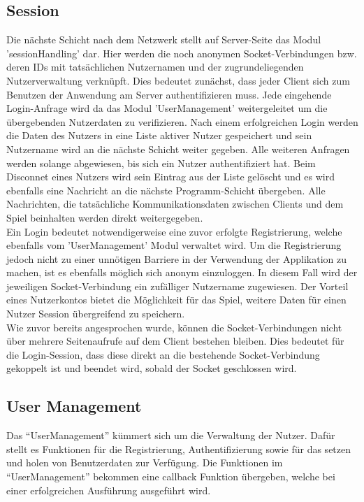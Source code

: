 \documentclass[a4paper]{spie}  %
\begin{document}
\subsection{Session}
Die nächste Schicht nach dem Netzwerk stellt auf Server-Seite das Modul 'sessionHandling' dar. Hier werden die noch anonymen Socket-Verbindungen bzw. deren IDs mit tatsächlichen Nutzernamen und der zugrundeliegenden Nutzerverwaltung verknüpft. Dies bedeutet zunächst, dass jeder Client sich zum Benutzen der Anwendung am Server authentifizieren muss. Jede eingehende Login-Anfrage wird da das Modul 'UserManagement' weitergeleitet um die übergebenden Nutzerdaten zu verifizieren. Nach einem erfolgreichen Login werden die Daten des Nutzers in eine Liste aktiver Nutzer gespeichert und sein Nutzername wird an die nächste Schicht weiter gegeben. Alle weiteren Anfragen werden solange abgewiesen, bis sich ein Nutzer authentifiziert hat. Beim Disconnet eines Nutzers wird sein Eintrag aus der Liste gelöscht und es wird ebenfalls eine Nachricht an die nächste Programm-Schicht übergeben. Alle Nachrichten, die tatsächliche Kommunikationsdaten zwischen Clients und dem Spiel beinhalten werden direkt weitergegeben.\\
Ein Login bedeutet notwendigerweise eine zuvor erfolgte Registrierung, welche ebenfalls vom 'UserManagement' Modul verwaltet wird. Um die Registrierung jedoch nicht zu einer unnötigen Barriere in der Verwendung der Applikation zu machen, ist es ebenfalls möglich sich anonym einzuloggen. In diesem Fall wird der jeweiligen Socket-Verbindung ein zufälliger Nutzername zugewiesen. Der Vorteil eines Nutzerkontos bietet die Möglichkeit für das Spiel, weitere Daten für einen Nutzer Session übergreifend zu speichern.\\
Wie zuvor bereits angesprochen wurde, können die Socket-Verbindungen nicht über mehrere Seitenaufrufe auf dem Client bestehen bleiben. Dies bedeutet für die Login-Session, dass diese direkt an die bestehende Socket-Verbindung gekoppelt ist und beendet wird, sobald der Socket geschlossen wird.\\

\subsection{User Management}
Das \enquote{UserManagement} kümmert sich um die Verwaltung der Nutzer. Dafür stellt es Funktionen für die Registrierung, Authentifizierung sowie für das setzen und holen von Benutzerdaten zur Verfügung. Die Funktionen im \enquote{UserManagement} bekommen eine callback Funktion übergeben, welche bei einer erfolgreichen Ausführung ausgeführt wird.
\end{document}
